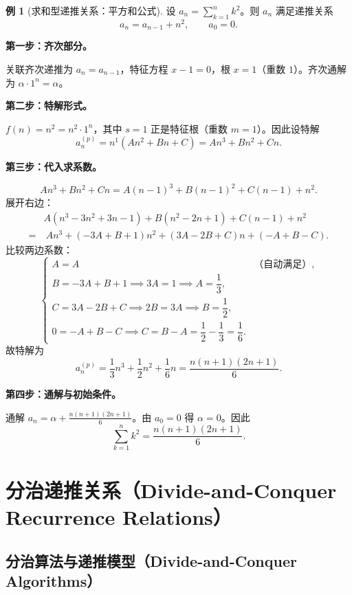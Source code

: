 \documentclass[UTF8,11pt,a4paper]{ctexbook}   %
\theoremstyle{definition}
\newtheorem{example}{例}[section]
\begin{document}
\begin{example}[求和型递推关系：平方和公式]
设 $a_n = \sum_{k=1}^{n} k^2$。则 $a_n$ 满足递推关系
\[
a_n = a_{n-1} + n^2,\qquad a_0 = 0.
\]

\textbf{第一步：齐次部分。}

关联齐次递推为 $a_n = a_{n-1}$，特征方程 $x - 1 = 0$，根 $x=1$（重数 $1$）。齐次通解为 $\alpha\cdot 1^n = \alpha$。

\textbf{第二步：特解形式。}

$f(n) = n^2 = n^2\cdot 1^n$，其中 $s=1$ 正是特征根（重数 $m=1$）。因此设特解
\[
a_n^{(p)} = n^1(An^2 + Bn + C) = An^3 + Bn^2 + Cn.
\]

\textbf{第三步：代入求系数。}

\[
An^3 + Bn^2 + Cn = A(n-1)^3 + B(n-1)^2 + C(n-1) + n^2.
\]
展开右边：
\begin{align*}
& A(n^3 - 3n^2 + 3n - 1) + B(n^2 - 2n + 1) + C(n-1) + n^2\\
=&\ An^3 + (-3A + B + 1)n^2 + (3A - 2B + C)n + (-A + B - C).
\end{align*}
比较两边系数：
\[
\begin{cases}
A = A & \text{（自动满足）},\\
B = -3A + B + 1 \implies 3A = 1 \implies A = \dfrac{1}{3},\\[0.5em]
C = 3A - 2B + C \implies 2B = 3A \implies B = \dfrac{1}{2},\\[0.5em]
0 = -A + B - C \implies C = B - A = \dfrac{1}{2} - \dfrac{1}{3} = \dfrac{1}{6}.
\end{cases}
\]
故特解为
\[
a_n^{(p)} = \frac{1}{3}n^3 + \frac{1}{2}n^2 + \frac{1}{6}n = \frac{n(n+1)(2n+1)}{6}.
\]

\textbf{第四步：通解与初始条件。}

通解 $a_n = \alpha + \frac{n(n+1)(2n+1)}{6}$。由 $a_0=0$ 得 $\alpha=0$。因此
\[
\boxed{\sum_{k=1}^{n} k^2 = \frac{n(n+1)(2n+1)}{6}}.
\]
\end{example}

\section{分治递推关系（Divide-and-Conquer Recurrence Relations）}

\subsection{分治算法与递推模型（Divide-and-Conquer Algorithms）}
\end{document}
